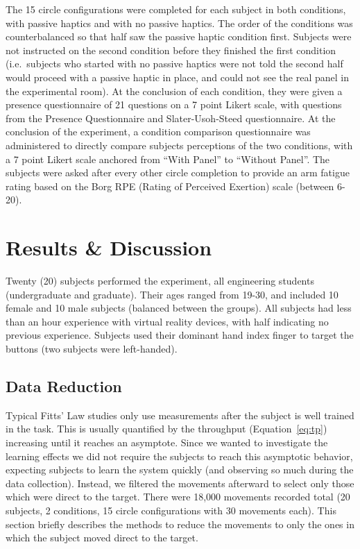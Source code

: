 \documentclass[]{aiaa-tc}%
\begin{document}
The 15 circle configurations were completed for each subject in both conditions, with passive haptics and with no passive haptics.
The order of the conditions was counterbalanced so that half saw the passive haptic condition first.
Subjects were not instructed on the second condition before they finished the first condition (i.e.\ subjects who started with no passive haptics were not told the second half would proceed with a passive haptic in place, and could not see the real panel in the experimental room).
At the conclusion of each condition, they were given a presence questionnaire of 21 questions on a 7 point Likert scale, with questions from the Presence Questionnaire and Slater-Usoh-Steed questionnaire.
At the conclusion of the experiment, a condition comparison questionnaire was administered to directly compare subjects perceptions of the two conditions, with a 7 point Likert scale anchored from ``With Panel'' to ``Without Panel''.
The subjects were asked after every other circle completion to provide an arm fatigue rating based on the Borg RPE (Rating of Perceived Exertion) scale (between 6-20).

\section{Results \& Discussion}
Twenty (20) subjects performed the experiment, all engineering students (undergraduate and graduate).
Their ages ranged from 19-30, and included 10 female and 10 male subjects (balanced between the groups).
All subjects had less than an hour experience with virtual reality devices, with half indicating no previous experience.
Subjects used their dominant hand index finger to target the buttons (two subjects were left-handed).

\subsection{Data Reduction}
Typical Fitts' Law studies only use measurements after the subject is well trained in the task.
This is usually quantified by the throughput (Equation~\ref{eq:tp}) increasing until it reaches an asymptote.
Since we wanted to investigate the learning effects we did not require the subjects to reach this asymptotic behavior, expecting subjects to learn the system quickly (and observing so much during the data collection).
Instead, we filtered the movements afterward to select only those which were direct to the target.
There were 18,000 movements recorded total (20 subjects, 2 conditions, 15 circle configurations with 30 movements each).
This section briefly describes the methods to reduce the movements to only the ones in which the subject moved direct to the target.
\end{document}
